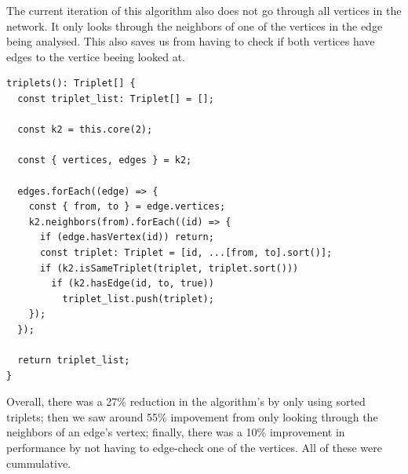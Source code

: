 The current iteration of this algorithm also does not go through all vertices in the network.
It only looks through the neighbors of one of the vertices in the edge being analysed.
This also saves us from having to check if both vertices have edges to the vertice beeing looked at.

\begin{verbatim}
triplets(): Triplet[] {
  const triplet_list: Triplet[] = [];

  const k2 = this.core(2);

  const { vertices, edges } = k2;

  edges.forEach((edge) => {
    const { from, to } = edge.vertices;
    k2.neighbors(from).forEach((id) => {
      if (edge.hasVertex(id)) return;
      const triplet: Triplet = [id, ...[from, to].sort()];
      if (k2.isSameTriplet(triplet, triplet.sort()))
        if (k2.hasEdge(id, to, true))
          triplet_list.push(triplet);
    });
  });

  return triplet_list;
}
\end{verbatim}

Overall, there was a 27\% reduction in the algorithm's by only using sorted triplets;
then we saw around 55\% impovement
from only looking through the neighbors of an edge's vertex;
finally, there was a 10\% improvement in performance
by not having to edge-check one of the vertices.
All of these were cummulative.
